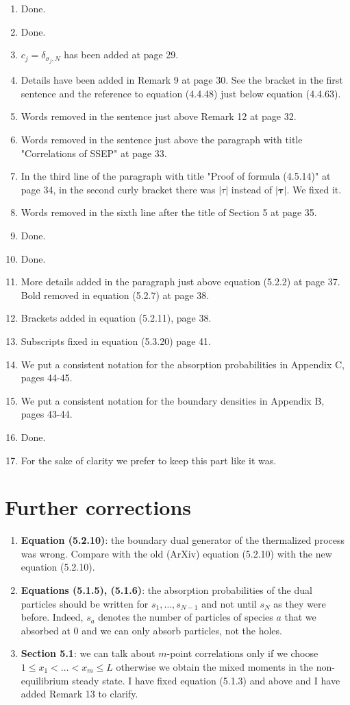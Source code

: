 \documentclass[10pt]{article}
\numberwithin{equation}{section}
\numberwithin{equation}{subsection}
\begin{document}
\begin{enumerate}
			\item Done.
			\item Done.
			\item $c_{j}=\delta_{\sigma_{j},N}$ has been added at page 29.
			\item Details have been added in Remark 9 at page 30. See the bracket in the first sentence and the reference to equation (4.4.48) just below equation (4.4.63).
			\item Words removed in the sentence just above Remark 12 at page 32. 
			\item Words removed in the sentence just above the paragraph with title "Correlations of SSEP" at page 33.
			\item In the third line of the paragraph with title "Proof of formula (4.5.14)" at page 34, in the second curly bracket there was $|\tau|$ instead of $|\bm{\tau}|$. We fixed it.
			\item Words removed in the sixth line after the title of Section 5 at page 35. 
			\item Done.
			\item Done.
			\item More details added in the paragraph just above equation (5.2.2) at page 37. Bold removed in equation (5.2.7) at page 38.
			\item Brackets added in equation (5.2.11), page 38.
			\item Subscripts fixed in equation (5.3.20) page 41.
			\item We put a consistent notation for the absorption probabilities in Appendix C, pages 44-45. 
			\item We put a consistent notation for the boundary densities in Appendix B, pages 43-44.
			\item Done.
			\item For the sake of clarity we prefer to keep this part like it was.
		\end{enumerate}
\section*{Further corrections}
\begin{enumerate}
\item \textbf{Equation (5.2.10)}: the boundary dual generator of the thermalized process was wrong. Compare with the old (ArXiv) equation (5.2.10) with the new equation (5.2.10).
\item \textbf{Equations (5.1.5), (5.1.6)}: the absorption probabilities of the dual particles should be written for $s_{1},\ldots,s_{N-1}$ and not until $s_{N}$ as they were before. Indeed, $s_{a}$ denotes the number of particles of species $a$ that we absorbed at $0$ and we can only absorb particles, not the holes. 
\item \textbf{Section 5.1}: we can talk about $m$-point correlations only if we choose $1\leq x_{1}<\ldots<x_{m}\leq L$ otherwise  we obtain the mixed moments in the non-equilibrium steady state. I have fixed equation (5.1.3) and above and I have added Remark 13 to clarify.
\end{enumerate}
	
\end{document}
